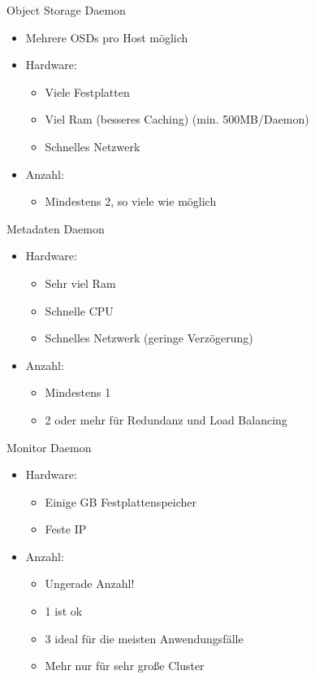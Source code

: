 \documentclass[notes=hide,yellow]{beamer}
\begin{document}
\begin{frame}{Object Storage Daemon}
	\begin{itemize}
		\item Mehrere OSDs pro Host m\"oglich
		\item Hardware:
		\begin{itemize}
			\item Viele Festplatten 
			\item Viel Ram (besseres Caching) (min. 500MB/Daemon)
			\item Schnelles Netzwerk
		\end{itemize}
		\item Anzahl:
		\begin{itemize}
			\item Mindestens 2, so viele wie m\"oglich
		\end{itemize}
	\end{itemize}
\end{frame}


\begin{frame}{Metadaten Daemon}
	\begin{itemize}

		\item Hardware:
		\begin{itemize}
			\item Sehr viel Ram
			\item Schnelle CPU
			\item Schnelles Netzwerk (geringe Verz\"ogerung)
		\end{itemize}
		\item Anzahl: 
		\begin{itemize}
			\item Mindestens 1
			\item 2 oder mehr f\"ur Redundanz und Load Balancing
		\end{itemize}
	\end{itemize}
\end{frame}


\begin{frame}{Monitor Daemon}
	\begin{itemize}
		\item Hardware:
		\begin{itemize}
			\item Einige GB Festplattenspeicher
			\item Feste IP
		\end{itemize}
		\item Anzahl:
		\begin{itemize}
			\item Ungerade Anzahl!
			\item 1 ist ok
			\item 3 ideal f\"ur die meisten Anwendungsf\"alle
			\item Mehr nur f\"ur sehr große Cluster
		\end{itemize}
	\end{itemize}
\end{frame}
\end{document}
